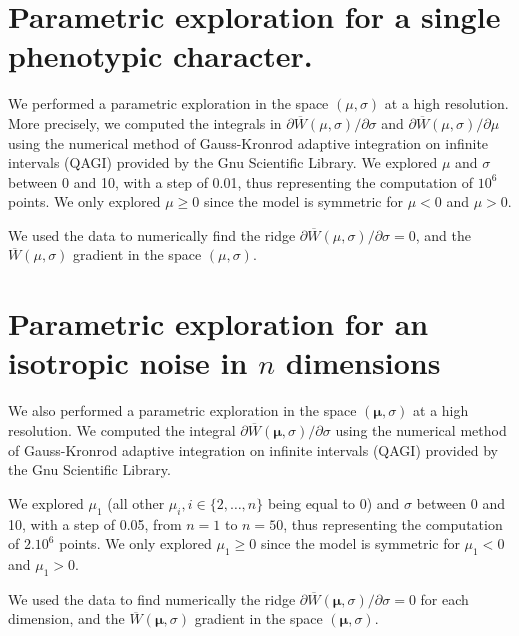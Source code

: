
\section*{Parametric exploration for a single phenotypic character.}

We performed a parametric exploration in the space $(\mu,\sigma)$ at a high resolution. More precisely, we computed the integrals in $\partial \overline{W}(\mu,\sigma)/\partial \sigma$ and $\partial \overline{W}(\mu,\sigma)/\partial \mu$ using the numerical method of Gauss-Kronrod adaptive integration on infinite intervals (QAGI) provided by the Gnu Scientific Library. We explored $\mu$ and $\sigma$ between 0 and 10, with a step of 0.01, thus representing the computation of $10^6$ points. We only explored $\mu \geq 0$ since the model is symmetric for $\mu < 0$ and $\mu > 0$.

We used the data to numerically find the ridge $\partial \overline{W}(\mu,\sigma)/\partial \sigma=0$, and the $\overline{W}(\mu,\sigma)$ gradient in the space $(\mu,\sigma)$.


\section*{Parametric exploration for an isotropic noise in $n$ dimensions}

We also performed a parametric exploration in the space $(\boldsymbol{\mu},\sigma)$ at a high resolution. We computed the integral $\partial \overline{W}(\boldsymbol{\mu},\sigma)/\partial \sigma$ using the numerical method of Gauss-Kronrod adaptive integration on infinite intervals (QAGI) provided by the Gnu Scientific Library.

We explored $\mu_1$ (all other $\mu_i, i \in \{2,\dots,n\}$ being equal to 0) and $\sigma$ between 0 and 10, with a step of 0.05, from $n=1$ to $n=50$, thus representing the computation of $2.10^6$ points. We only explored $\mu_1 \geq 0$ since the model is symmetric for $\mu_1 < 0$ and $\mu_1 > 0$.

We used the data to find numerically the ridge $\partial \overline{W}(\boldsymbol{\mu},\sigma)/\partial \sigma=0$ for each dimension, and the $\overline{W}(\boldsymbol{\mu},\sigma)$ gradient in the space $(\boldsymbol{\mu},\sigma)$.

